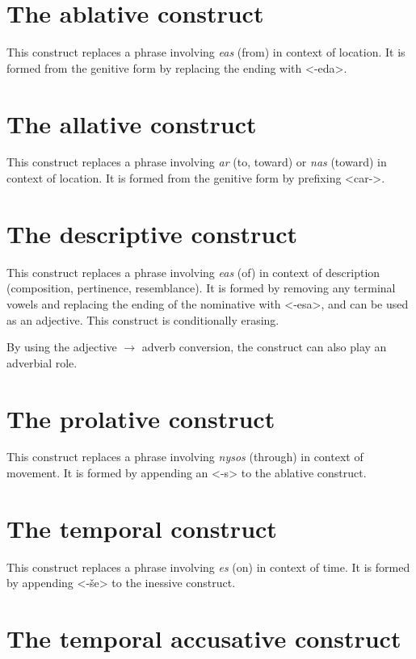 \documentclass{book}
\begin{document}
\section{The ablative construct}

This construct replaces a phrase involving \emph{eas} (from) in context of location. It is formed from the genitive form by replacing the ending with <-eda>.

\section{The allative construct}

This construct replaces a phrase involving \emph{ar} (to, toward) or \emph{nas} (toward) in context of location. It is formed from the genitive form by prefixing <car->.

\section{The descriptive construct}

This construct replaces a phrase involving \emph{eas} (of) in context of description (composition, pertinence, resemblance). It is formed by removing any terminal vowels and replacing the ending of the nominative with <-esa>, and can be used as an adjective. This construct is conditionally erasing.

By using the adjective $\rightarrow$ adverb conversion, the construct can also play an adverbial role.

\section{The prolative construct}

This construct replaces a phrase involving \emph{nysos} (through) in context of movement. It is formed by appending an <-s> to the ablative construct.

\section{The temporal construct}

This construct replaces a phrase involving \emph{es} (on) in context of time. It is formed by appending <-še> to the inessive construct.

\section{The temporal accusative construct}
\end{document}
